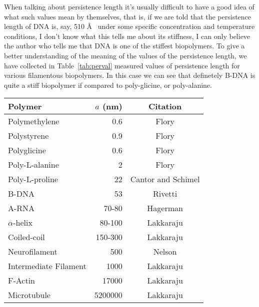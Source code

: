 When talking about persistence length it's usually difficult to have a
good idea of what such values mean by themselves, that is, if we are
told that  the persistence length of  DNA is, say, 510 \AA~ under some
specific concentration  and temperature conditions, I  don't know what
this tells me  about its stiffness, I can only  believe the author who
tells me that DNA is one of the stiffest biopolymers. To give a better
understanding of the meaning of  the values of the persistence length,
we  have  collected   in  Table~\ref{tab:perval}  measured  values  of
persistence length  for various filamentous biopolymers.  In this case
we  can see  that  definetely B-DNA  is  quite a  stiff biopolymer  if
compared to poly-glicine, or poly-alanine.

\begin{table}[htbp]
\begin{center}
\begin{threeparttable}
\begin{tabular}{l|r|c}
\hline
Polymer               & $a$ (nm) & Citation  \\ \hline
Polymethylene         & 0.6      & Flory\tnote{a}      \\  
Polystyrene           & 0.9      & Flory\tnote{a}      \\
Polyglicine           & 0.6      & Flory \tnote{b}     \\
Poly-L-alanine        & 2        & Flory \tnote{b}     \\
Poly-L-proline        & 22       & Cantor and Schimel \cite{cantor1980} \\
B-DNA                 & 53       & Rivetti \cite{rivetti1996}     \\
A-RNA                 & 70-80    & Hagerman  \cite{hagerman1997}  \\
$\alpha$-helix        & 80-100   & Lakkaraju \cite{lakkaraju2009} \\
Coiled-coil           & 150-300  & Lakkaraju \cite{lakkaraju2009} \\
Neurofilament         & 500      & Nelson    \cite{nelson2004}    \\
Intermediate Filament & 1000     & Lakkaraju \cite{lakkaraju2009} \\
F-Actin               & 17000    & Lakkaraju \cite{lakkaraju2009} \\
Microtubule           & 5200000  & Lakkaraju \cite{lakkaraju2009} \\
\hline
\end{tabular}
\begin{tablenotes}

\end{tablenotes}
\end{threeparttable}
\end{center}
\end{table}
